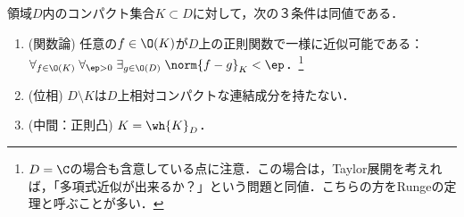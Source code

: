 \documentclass[uplatex, dvipdfmx]{jsreport}
\begin{document}
\begin{theorem}\label{thm-Runge}
    領域$D$内のコンパクト集合$K\subset D$に対して，次の３条件は同値である．
    \begin{enumerate}
        \item (関数論) 任意の$f\in\O(K)$が$D$上の正則関数で一様に近似可能である：$\forall_{f\in\O(K)}\;\forall_{\ep>0}\;\exists_{g\in\O(D)}\;\norm{f-g}_K<\ep$．\footnote{$D=\C$の場合も含意している点に注意．この場合は，Taylor展開を考えれば，「多項式近似が出来るか？」という問題と同値．こちらの方をRungeの定理と呼ぶことが多い．}
        \item (位相) $D\setminus K$は$D$上相対コンパクトな連結成分を持たない．
        \item (中間：正則凸) $K=\wh{K}_D$．
    \end{enumerate}
\end{theorem}
\end{document}
